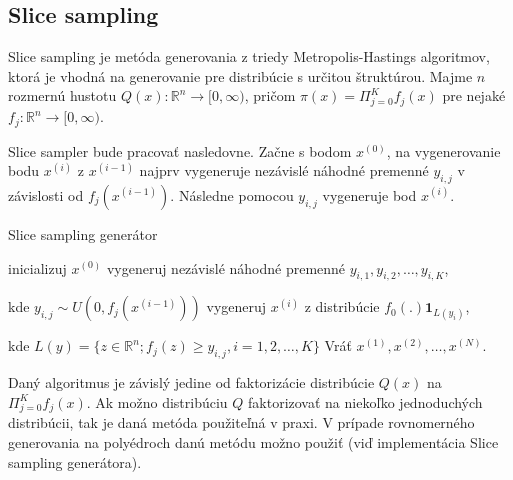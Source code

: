 \subsection{Slice sampling}

Slice sampling je metóda generovania z triedy Metropolis-Hastings algoritmov, ktorá je vhodná na generovanie pre distribúcie s určitou štruktúrou.
Majme $n$ rozmernú hustotu $Q(x): \mathbb{R}^n \rightarrow [0,\infty)$, pričom $\pi(x) = \Pi^K_{j=0}f_j(x)$ pre nejaké $f_j: \mathbb{R}^n \rightarrow [0,\infty)$.

Slice sampler bude pracovať nasledovne. Začne s bodom $x^{(0)}$, na vygenerovanie bodu $x^{(i)}$ z $x^{(i-1)}$ najprv vygeneruje nezávislé náhodné premenné $y_{i,j}$ v závislosti od $f_j(x^{(i-1)})$. Následne pomocou $y_{i,j}$ vygeneruje bod $x^{(i)}$.

\begin{algorithm}[H]
	\caption{Slice sampling generátor \cite{slice_convergence_roberts}}
	\label{slice}
	\begin{algorithmic}[1]
		\State inicializuj $x^{(0)}$
			\State vygeneruj nezávislé náhodné premenné $y_{i,1},y_{i,2},\dots, y_{i,K}$,

			kde $y_{i,j} \sim U(0,f_j(x^{(i-1)}))$
			\State vygeneruj $x^{(i)}$ z distribúcie $f_0(.)\mathbf{1}_{L(y_{i})}$,

			kde $L(y)= \{ z \in \mathbb{R}^n; f_j(z) \geq y_{i,j}, i=1,2, \dots, K\}$
		\EndFor
		\State Vráť ${x^{(1)},x^{(2)},\dots,x^{(N)}}$.
	\end{algorithmic}
\end{algorithm}

Daný algoritmus je závislý jedine od faktorizácie distribúcie $Q(x)$ na $\Pi^K_{j=0}f_j(x)$. Ak možno distribúciu $Q$ faktorizovať na niekoľko jednoduchých distribúcii, tak je daná metóda použiteľná v praxi. V prípade rovnomerného generovania na polyédroch danú metódu možno použiť (viď implementácia Slice sampling generátora).


